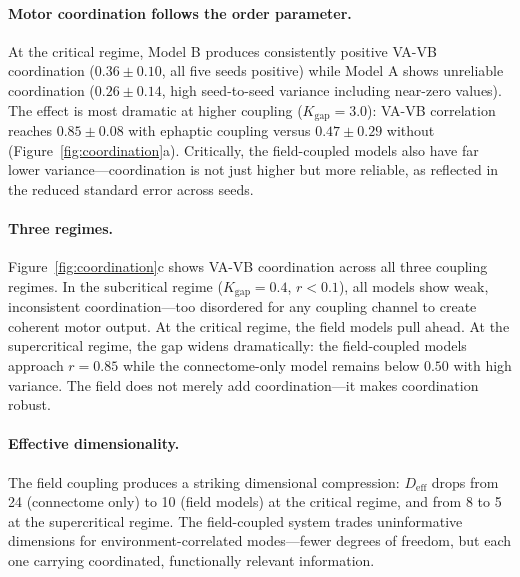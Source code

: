 \documentclass[12pt]{article}
\newcommand{\Deff}{D_{\mathrm{eff}}}
\begin{document}
\paragraph{Motor coordination follows the order parameter.} At the critical regime, Model B produces consistently positive VA-VB coordination ($0.36 \pm 0.10$, all five seeds positive) while Model A shows unreliable coordination ($0.26 \pm 0.14$, high seed-to-seed variance including near-zero values). The effect is most dramatic at higher coupling ($K_{\mathrm{gap}} = 3.0$): VA-VB correlation reaches $0.85 \pm 0.08$ with ephaptic coupling versus $0.47 \pm 0.29$ without (Figure~\ref{fig:coordination}a). Critically, the field-coupled models also have far lower variance---coordination is not just higher but more reliable, as reflected in the reduced standard error across seeds.

\paragraph{Three regimes.} Figure~\ref{fig:coordination}c shows VA-VB coordination across all three coupling regimes. In the subcritical regime ($K_{\mathrm{gap}} = 0.4$, $r < 0.1$), all models show weak, inconsistent coordination---too disordered for any coupling channel to create coherent motor output. At the critical regime, the field models pull ahead. At the supercritical regime, the gap widens dramatically: the field-coupled models approach $r = 0.85$ while the connectome-only model remains below $0.50$ with high variance. The field does not merely add coordination---it makes coordination robust.

\paragraph{Effective dimensionality.} The field coupling produces a striking dimensional compression: $\Deff$ drops from 24 (connectome only) to 10 (field models) at the critical regime, and from 8 to 5 at the supercritical regime. The field-coupled system trades uninformative dimensions for environment-correlated modes---fewer degrees of freedom, but each one carrying coordinated, functionally relevant information.
\end{document}
